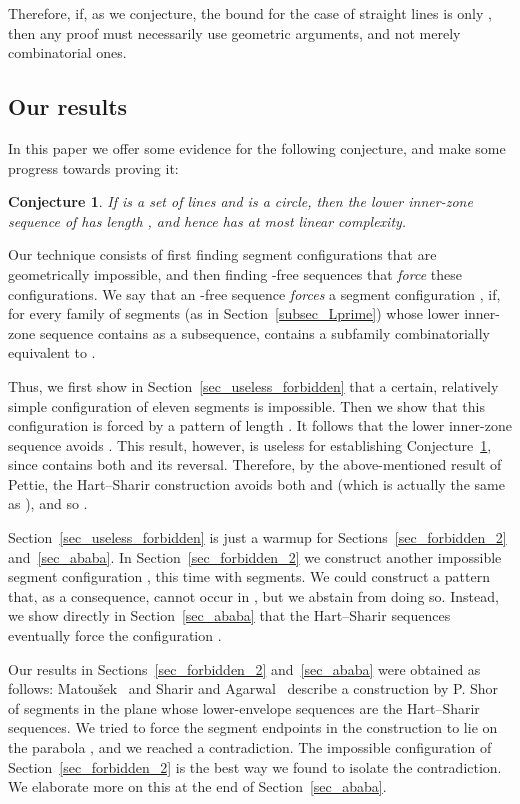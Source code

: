 \documentclass[11pt]{article}
\newtheorem{conjecture}[theorem]{Conjecture}
\theoremstyle{definition}
\theoremstyle{remark}
\begin{document}
Therefore, if, as we conjecture, the bound for the case of straight lines is only , then any proof must necessarily use geometric arguments, and not merely combinatorial ones.

\subsection{Our results}\label{subsec_our_results}

In this paper we offer some evidence for the following conjecture, and make some progress towards proving it:

\begin{conjecture}\label{conj}
If  is a set of  lines and  is a circle, then the lower inner-zone sequence  of  has length , and hence  has at most linear complexity.
\end{conjecture}

Our technique consists of first finding segment configurations that are geometrically impossible, and then finding -free sequences that \emph{force} these configurations. We say that an -free sequence  \emph{forces} a segment configuration , if, for every family of segments  (as in Section~\ref{subsec_Lprime}) whose lower inner-zone sequence contains  as a subsequence,  contains a subfamily combinatorially equivalent to .

Thus, we first show in Section~\ref{sec_useless_forbidden} that a certain, relatively simple configuration of eleven segments is impossible. Then we show that this configuration is forced by a pattern  of length . It follows that the lower inner-zone sequence  avoids . This result, however, is useless for establishing Conjecture~\ref{conj}, since  contains both  and its reversal. Therefore, by the above-mentioned result of Pettie, the Hart--Sharir construction avoids both  and  (which is actually the same as ), and so .

Section~\ref{sec_useless_forbidden} is just a warmup for Sections~\ref{sec_forbidden_2} and~\ref{sec_ababa}. In Section~\ref{sec_forbidden_2} we construct another impossible segment configuration , this time with  segments. We could construct a pattern  that, as a consequence, cannot occur in , but we abstain from doing so. Instead, we show directly in Section~\ref{sec_ababa} that the Hart--Sharir sequences eventually force the configuration .

Our results in Sections~\ref{sec_forbidden_2} and~\ref{sec_ababa} were obtained as follows: Matou\v sek~\cite{mat_DG} and Sharir and Agarwal~\cite{DS_book} describe a construction by P. Shor of segments in the plane whose lower-envelope sequences are the Hart--Sharir sequences. We tried to force the segment endpoints in the construction to lie on the parabola , and we reached a contradiction. The impossible configuration  of Section~\ref{sec_forbidden_2} is the best way we found to isolate the contradiction. We elaborate more on this at the end of Section~\ref{sec_ababa}.
\end{document}

